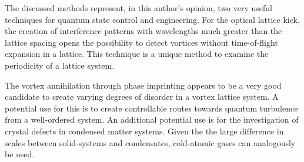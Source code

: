 The discussed methods represent, in this author's opinion, two very useful techniques for quantum state control and engineering. For the optical lattice kick, the creation of interference patterns with wavelengths much greater than the lattice spacing opens the possibility to detect vortices without time-of-flight expansion in a lattice. This technique is a unique method to examine the periodicity of a lattice system.

The vortex annihilation through phase imprinting appears to be a very good candidate to create varying degrees of disorder in a vortex lattice system. A potential use for this is to create controllable routes towards quantum turbulence from a well-ordered system. An additional potential use is for the investigation of crystal defects in condensed matter systems. Given the the large difference in scales between solid-systems and condensates, cold-atomic gases can analogously be used.
